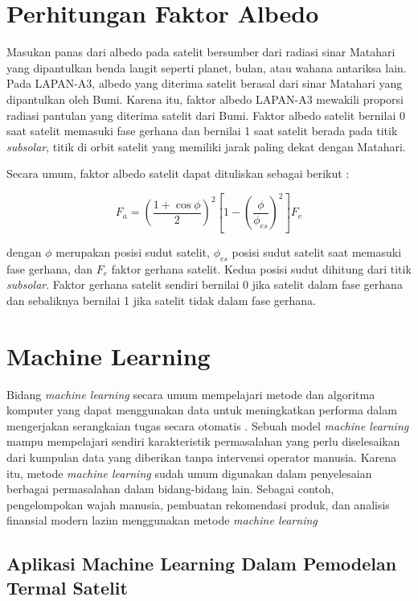 \section{Perhitungan Faktor Albedo}

Masukan panas dari albedo pada satelit bersumber dari radiasi sinar Matahari
yang dipantulkan benda langit seperti planet, bulan, atau wahana antariksa
lain. Pada LAPAN-A3, albedo yang diterima satelit berasal dari sinar Matahari
yang dipantulkan oleh Bumi. Karena itu, faktor albedo LAPAN-A3 mewakili
proporsi radiasi pantulan yang diterima satelit dari Bumi. Faktor albedo
satelit bernilai 0 saat satelit memasuki fase gerhana dan bernilai 1 saat
satelit berada pada titik \textit{subsolar}, titik di orbit satelit yang
memiliki jarak paling dekat dengan Matahari. 

Secara umum, faktor albedo satelit dapat dituliskan sebagai berikut :

\begin{equation}
\label{eq:albedofactor}
F_a = \left( \frac{1 + \cos{\phi}}{2} \right)^2 \left[ 1 - \left( \frac{\phi}{\phi_{es}} \right)^2 \right] F_e
\end{equation}

dengan $\phi$ merupakan posisi sudut satelit, $\phi_{es}$ posisi sudut satelit
saat memasuki fase gerhana, dan $F_e$ faktor gerhana satelit. Kedua posisi
sudut dihitung dari titik \textit{subsolar}. Faktor gerhana satelit sendiri
bernilai 0 jika satelit dalam fase gerhana dan sebaliknya bernilai 1 jika
satelit tidak dalam fase gerhana.

\section{Machine Learning}

Bidang \textit{machine learning} secara umum mempelajari metode dan algoritma
komputer yang dapat menggunakan data untuk meningkatkan performa dalam
mengerjakan serangkaian tugas secara otomatis \cite{mitchell1997}. Sebuah model
\textit{machine learning} mampu mempelajari sendiri karakteristik permasalahan
yang perlu diselesaikan dari kumpulan data yang diberikan tanpa intervensi
operator manusia. Karena itu, metode \textit{machine learning} sudah umum
digunakan dalam penyelesaian berbagai permasalahan dalam bidang-bidang lain.
Sebagai contoh, pengelompokan wajah manusia, pembuatan rekomendasi produk, dan
analisis finansial modern lazim menggunakan metode \textit{machine learning}

\subsection{Aplikasi Machine Learning Dalam Pemodelan Termal Satelit}

